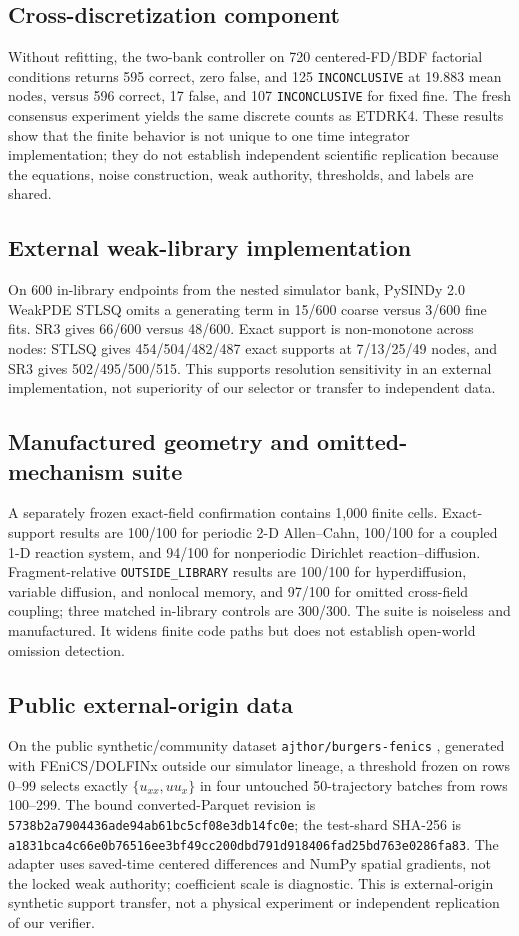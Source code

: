 \documentclass{article}
\newcommand{\OUT}{\texttt{OUTSIDE\_LIBRARY}\xspace}
\newcommand{\INC}{\texttt{INCONCLUSIVE}\xspace}
\begin{document}
\subsection{Cross-discretization component}
Without refitting, the two-bank controller on 720 centered-FD/BDF factorial conditions returns 595 correct,
zero false, and 125 \INC at 19.883 mean nodes, versus 596 correct, 17 false, and 107 \INC for fixed
fine. The fresh consensus experiment yields the same discrete counts as ETDRK4. These results show
that the finite behavior is not unique to one time integrator implementation; they do not establish
independent scientific replication because the equations, noise construction, weak authority,
thresholds, and labels are shared.

\subsection{External weak-library implementation}
On 600 in-library endpoints from the nested simulator bank, PySINDy 2.0
\citep{kaptanoglu2022pysindy} WeakPDE STLSQ omits a
generating term in 15/600 coarse versus 3/600 fine fits. SR3 gives 66/600 versus 48/600. Exact
support is non-monotone across nodes: STLSQ gives 454/504/482/487 exact supports at
7/13/25/49 nodes, and SR3 gives 502/495/500/515. This supports resolution sensitivity in an
external implementation, not superiority of our selector or transfer to independent data.

\subsection{Manufactured geometry and omitted-mechanism suite}
A separately frozen exact-field confirmation contains 1,000 finite cells. Exact-support results
are 100/100 for periodic 2-D Allen--Cahn, 100/100 for a coupled 1-D reaction system, and 94/100
for nonperiodic Dirichlet reaction--diffusion. Fragment-relative \OUT results are 100/100 for
hyperdiffusion, variable diffusion, and nonlocal memory, and 97/100 for omitted cross-field
coupling; three matched in-library controls are 300/300. The suite is noiseless and manufactured.
It widens finite code paths but does not establish open-world omission detection.

\subsection{Public external-origin data}
On the public synthetic/community dataset \texttt{ajthor/burgers-fenics}
\citep{thorpe2025burgersfenics}, generated with FEniCS/DOLFINx outside our simulator lineage, a
threshold frozen on rows 0--99 selects exactly $\{u_{xx},uu_x\}$ in four untouched 50-trajectory
batches from rows 100--299. The bound converted-Parquet revision is
\texttt{5738b2a7904436ade94ab61bc5cf08e3db14fc0e}; the test-shard SHA-256 is
\texttt{a1831bca4c66e0b76516ee3bf49cc200dbd791d918406fad25bd763e0286fa83}. The
adapter uses saved-time centered differences and NumPy spatial gradients, not the locked weak
authority; coefficient scale is diagnostic. This is external-origin synthetic support transfer,
not a physical experiment or independent replication of our verifier.
\end{document}
